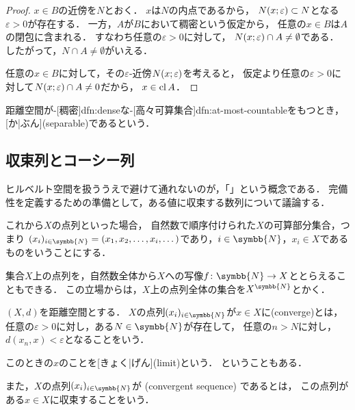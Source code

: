 \documentclass[../sotsu.tex]{subfiles}
\begin{document}
\begin{proof}
    \quad 
    $x \in B$の近傍を$N$とおく．
    $x$は$N$の内点であるから，
    $N(x; \varepsilon) \subset N$となる$\varepsilon > 0$が存在する．
    一方，$A$が$B$において稠密という仮定から，
    任意の$x \in B$は$A$の閉包に含まれる．
    すなわち任意の$\varepsilon > 0$に対して，
    $N(x; \varepsilon) \cap A \neq \emptyset$である．
    したがって，$N \cap A \neq \emptyset$がいえる．

    \quad 
    任意の$x \in B$に対して，その$\varepsilon$-近傍$N(x; \varepsilon)$を考えると，
    仮定より任意の$\varepsilon > 0$に対して$N(x; \varepsilon) \cap A \neq 0$だから，
    $x \in \operatorname{cl}{A}$．
\end{proof}


\begin{definition}
    \label{dfn:separable}
    距離空間が-[稠密]{dfn:dense}な-[高々可算集合]{dfn:at-most-countable}をもつとき，
    [か|ぶん](separable)であるという．
\end{definition}





\subsection{収束列とコーシー列}

ヒルベルト空間を扱ううえで避けて通れないのが，「」という概念である．
完備性を定義するための準備として，ある値に収束する数列について議論する．

これから$X$の点列といった場合，
自然数で順序付けられた$X$の可算部分集合，つまり
$\sequ{x_i}[i \in \symbb{N}] = (x_1, x_2, \dots, x_i, \dotsc)$であり，$i \in \symbb{N}$，$x_i \in X$であるものをいうことにする．

集合$X$上の点列を，自然数全体から$X$への写像$f \colon \symbb{N} \to X$ととらえることもできる．
この立場からは，$X$上の点列全体の集合を$X^{\symbb{N}}$とかく．

\begin{definition}[収束列]
    \label{dfn:convergent-sequence}
    $(X, d)$を距離空間とする．
    $X$の点列$\sequ{x_i}[i \in \symbb{N}]$が$x \in X$に(converge)とは，
    任意の$\varepsilon > 0$に対し，ある$N \in \symbb{N}$が存在して，
    任意の$n > N$に対し，$d(x_n, x) < \varepsilon$となることをいう．
    
    このときの$x$のことを[きょく|げん](limit)という\cite{uchida-set-2020}．
    ということもある．

    また，$X$の点列$\sequ{x_i}[i \in \symbb{N}]$が%
    (convergent sequence)%
    であるとは，
    この点列がある$x \in X$に収束することをいう．
\end{definition}
\end{document}
